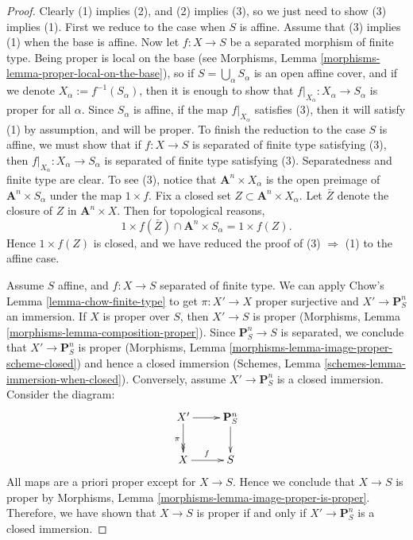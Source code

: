\begin{proof}
Clearly (1) implies (2), and (2) implies (3), so we just need to show (3)
implies (1).
First we reduce to the case when $S$ is affine.  Assume that (3) implies (1)
when the base is affine.  Now let $f: X \to S$ be a separated morphism of
finite type.  Being proper is local on the base
(see Morphisms, Lemma \ref{morphisms-lemma-proper-local-on-the-base}), so if
$S = \bigcup_\alpha S_\alpha$ is an open affine cover, and if
we denote $X_\alpha := f^{-1}(S_\alpha)$, then it is
enough to show that $f|_{X_\alpha}: X_\alpha \to S_\alpha$ is proper
for all $\alpha$.  Since $S_\alpha$ is affine, if
the map $f|_{X_\alpha}$ satisfies (3), then it will satisfy (1)
by assumption, and will be proper.  To finish the reduction to the
case $S$ is affine, we must show that if $f: X \to S$ is separated of
finite type satisfying (3), then $f|_{X_\alpha} : X_\alpha \to S_\alpha$
is separated of finite type satisfying (3).  Separatedness and finite
type are clear.  To see (3), notice that
$\mathbf{A}^n \times X_\alpha$ is the open preimage of
$\mathbf{A}^n \times S_\alpha$ under the map $1 \times f$.  Fix a closed
set $Z \subset \mathbf A^n \times X_\alpha$.  Let $\bar Z$ denote the
closure of $Z$ in $\mathbf{A}^n \times X$.  Then for topological
reasons,
$$
1 \times f(\bar Z) \cap \mathbf{A}^n \times S_\alpha  = 1 \times f(Z).
$$
Hence $1 \times f(Z)$ is closed, and we have reduced the proof of
(3) $\Rightarrow$ (1) to the affine case.

\medskip\noindent
Assume $S$ affine, and $f : X \to S$ separated of finite type.
We can apply Chow's Lemma \ref{lemma-chow-finite-type}
to get $\pi : X' \to X$ proper surjective and $X' \to \mathbf{P}^n_S$
an immersion. If $X$ is proper over $S$, then $X' \to S$ is proper
(Morphisms, Lemma \ref{morphisms-lemma-composition-proper}). Since
$\mathbf{P}^n_S \to S$ is separated, we conclude that $X' \to
\mathbf{P}^n_S$ is proper
(Morphisms, Lemma \ref{morphisms-lemma-image-proper-scheme-closed})
and hence a closed immersion
(Schemes, Lemma \ref{schemes-lemma-immersion-when-closed}).
Conversely, assume $X' \to \mathbf{P}^n_S$ is a closed immersion.
Consider the diagram:
\begin{equation}
\xymatrix{
X' \ar[r] \ar@{->>}[d]_{\pi} &
\mathbf{P}^n_S \ar[d] \\
X \ar[r]^f & S
}
\end{equation}
All maps are a priori proper except for $X \to S$.
Hence we conclude that $X \to S$ is proper by
Morphisms, Lemma \ref{morphisms-lemma-image-proper-is-proper}.
Therefore, we have shown that $X \to S$ is proper if and only if
$X' \to \mathbf{P}^n_S$ is a closed immersion.


\end{proof}
